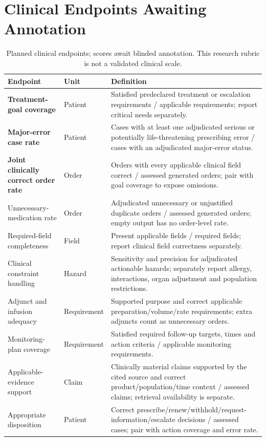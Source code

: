 \section{Clinical Endpoints Awaiting Annotation}
\begin{table}[t]\centering\small
\caption{Planned clinical endpoints; scores await blinded annotation. This research rubric is not a validated clinical scale.}\label{tab:clinicalmetrics}\begin{tabularx}{\textwidth}{@{}p{3.4cm}p{1.4cm}X@{}}\toprule Endpoint & Unit & Definition\\\midrule
\textbf{Treatment-goal coverage} & Patient & Satisfied predeclared treatment or escalation requirements / applicable requirements; report critical needs separately.\\
\textbf{Major-error case rate} & Patient & Cases with at least one adjudicated serious or potentially life-threatening prescribing error / cases with an adjudicated major-error status.\\
\textbf{Joint clinically correct order rate} & Order & Orders with every applicable clinical field correct / assessed generated orders; pair with goal coverage to expose omissions.\\
Unnecessary-medication rate & Order & Adjudicated unnecessary or unjustified duplicate orders / assessed generated orders; empty output has no order-level rate.\\
Required-field completeness & Field & Present applicable fields / required fields; report clinical field correctness separately.\\
Clinical constraint handling & Hazard & Sensitivity and precision for adjudicated actionable hazards; separately report allergy, interactions, organ adjustment and population restrictions.\\
Adjunct and infusion adequacy & Requirement & Supported purpose and correct applicable preparation/volume/rate requirements; extra adjuncts count as unnecessary orders.\\
Monitoring-plan coverage & Requirement & Satisfied required follow-up targets, times and action criteria / applicable monitoring requirements.\\
Applicable-evidence support & Claim & Clinically material claims supported by the cited source and correct product/population/time context / assessed claims; retrieval availability is separate.\\
Appropriate disposition & Patient & Correct prescribe/renew/withhold/request-information/escalate decisions / assessed cases; pair with action coverage and error rate.\\

\end{tabularx}
\end{table}
